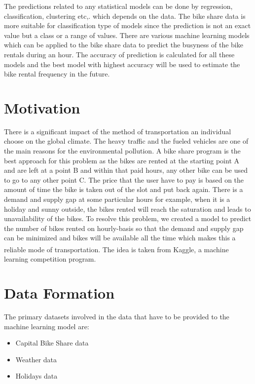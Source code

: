 \documentclass[journal, a4paper]{IEEEtran}
\begin{document}
    The predictions related to any statistical models can be done by regression, classification, clustering etc,. which depends on the data. The bike share data is more suitable for classification type of models since the prediction is not an exact value but a class or a range of values. There are various machine learning models which can be applied to the bike share data to predict the busyness of the bike rentals during an hour. The accuracy of prediction is calculated for all these models and the best model with highest accuracy will be used to estimate the bike rental frequency in the future.
    
\section{Motivation}
    There is a significant impact of the method of transportation an individual choose on the global climate. The heavy traffic and the fueled vehicles are one of the main reasons for the environmental pollution. A bike share program is the best approach for this problem as the bikes are rented at the starting point A and are left at a point B and within that paid hours, any other bike can be used to go to any other point C. The price that the user have to pay is based on the amount of time the bike is taken out of the slot and put back again. There is a demand and supply gap at some particular hours for example, when it is a holiday and sunny outside, the bikes rented will reach the saturation and leads to unavailability of the bikes. To resolve this problem, we created a model to predict the number of bikes rented on hourly-basis so that the demand and supply gap can be minimized and bikes will be available all the time which makes this a reliable mode of transportation. The idea is taken from Kaggle\textsuperscript{\cite{kaggle}}, a machine learning competition program.

\section{Data Formation}
The primary datasets involved in the data that have to be provided to the machine learning model are:
\begin{itemize}
\item Capital Bike Share data
\item Weather data
\item Holidays data
\end{itemize}
\end{document}
